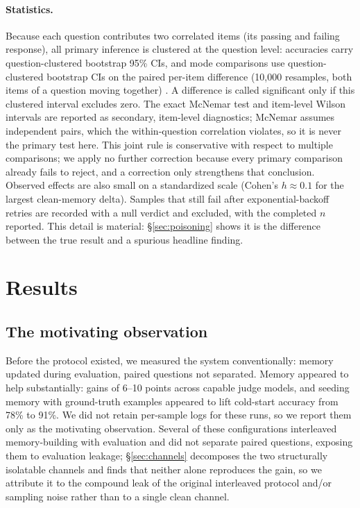 \documentclass[]{ceurart}
\begin{document}
\paragraph{Statistics.} Because each question contributes two correlated items (its passing and failing response), all primary inference is clustered at the question level: accuracies carry question-clustered bootstrap 95\% CIs, and mode comparisons use question-clustered bootstrap CIs on the paired per-item difference (10{,}000 resamples, both items of a question moving together) \citep{bootstrap1993}. A difference is called significant only if this clustered interval excludes zero. The exact McNemar test \citep{mcnemar1947} and item-level Wilson intervals \citep{wilson1927} are reported as secondary, item-level diagnostics; McNemar assumes independent pairs, which the within-question correlation violates, so it is never the primary test here. This joint rule is conservative with respect to multiple comparisons; we apply no further correction because every primary comparison already fails to reject, and a correction only strengthens that conclusion. Observed effects are also small on a standardized scale (Cohen's $h \approx 0.1$ for the largest clean-memory delta). Samples that still fail after exponential-backoff retries are recorded with a null verdict and excluded, with the completed $n$ reported. This detail is material: \S\ref{sec:poisoning} shows it is the difference between the true result and a spurious headline finding.

\section{Results}
\label{sec:results}

\subsection{The motivating observation}

Before the protocol existed, we measured the system conventionally: memory updated during evaluation, paired questions not separated. Memory appeared to help substantially: gains of 6--10 points across capable judge models, and seeding memory with ground-truth examples appeared to lift cold-start accuracy from 78\% to 91\%. We did not retain per-sample logs for these runs, so we report them only as the motivating observation. Several of these configurations interleaved memory-building with evaluation and did not separate paired questions, exposing them to evaluation leakage; \S\ref{sec:channels} decomposes the two structurally isolatable channels and finds that neither alone reproduces the gain, so we attribute it to the compound leak of the original interleaved protocol and/or sampling noise rather than to a single clean channel.
\end{document}
